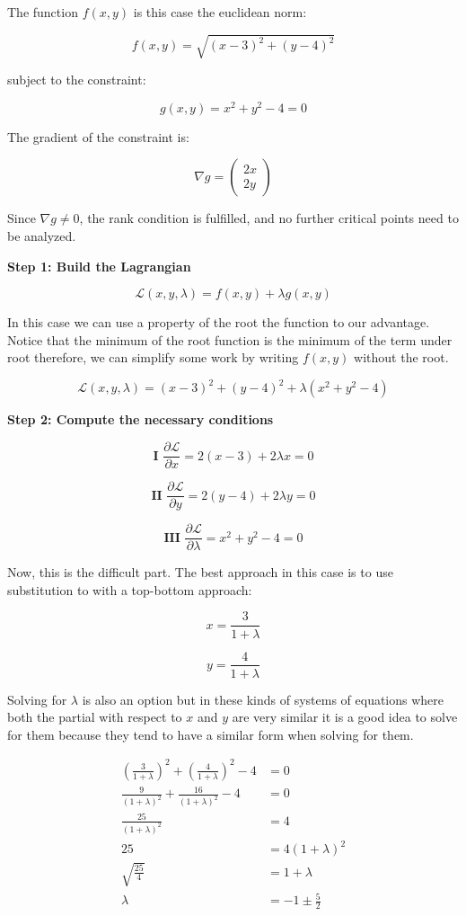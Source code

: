 The function \(f(x,y)\) is this case the euclidean norm:

\[
    f(x, y) = \sqrt{(x - 3)^2 + (y - 4)^2}
\]

subject to the constraint:

\[
    g(x, y) = x^2 + y^2 - 4 = 0
\]

The gradient of the constraint is:

\[
    \nabla g = \begin{pmatrix} 2x \\ 2y \end{pmatrix}
\]

Since \( \nabla g \ne 0 \), the rank condition is fulfilled, and no further critical points 
need to be analyzed.
\vspace{\baselineskip}

\textbf{Step 1: Build the Lagrangian}

\[
    \mathcal{L}(x, y, \lambda) = f(x, y) + \lambda g(x, y)
\]

In this case we can use a property of the root the function to our advantage. Notice that the minimum 
of the root function is the minimum of the term under root therefore, we can simplify some work by writing 
\(f(x,y)\) without the root. 

\[
    \mathcal{L}(x, y, \lambda) = (x - 3)^2 + (y - 4)^2 + \lambda (x^2 + y^2 - 4)
\]

\textbf{Step 2: Compute the necessary conditions}

\[
    \textbf{I } \frac{\partial \mathcal{L}}{\partial x} = 2(x - 3) + 2\lambda x = 0
\]

\[
    \textbf{II } \frac{\partial \mathcal{L}}{\partial y} = 2(y - 4) + 2\lambda y = 0
\]

\[
    \textbf{III } \frac{\partial \mathcal{L}}{\partial \lambda} = x^2 + y^2 - 4 = 0
\]

Now, this is the difficult part. The best approach in this case is to use substitution to 
with a top-bottom approach:

\[
    x = \frac{3}{1 + \lambda}
\]

\[
    y = \frac{4}{1 + \lambda}
\]

Solving for \(\lambda\) is also an option but in these kinds of systems of equations where 
both the partial with respect to \(x\) and \(y\) are very similar it is a good idea to solve for them because 
they tend to have a similar form when solving for them.

\begin{align*}
    \left(\frac{3}{1 + \lambda}\right)^2 + \left(\frac{4}{1 + \lambda}\right)^2 - 4 &= 0\\
    \frac{9}{(1 + \lambda)^2} + \frac{16}{(1 + \lambda)^2} - 4 &= 0\\
    \frac{25}{(1 + \lambda)^2} &= 4 \\
    25 &= 4 (1 + \lambda)^2 \\
    \sqrt{\frac{25}{4}} &= 1 + \lambda \\
    \lambda &= -1 \pm \frac{5}{2}
\end{align*}

